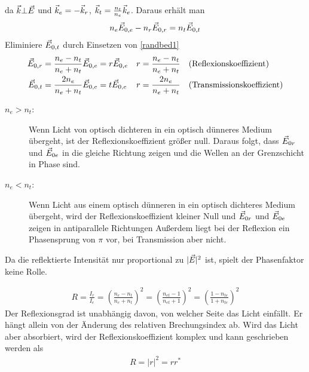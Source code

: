 da $\vec{k}\bot\vec{E}$ und $\vec{k}_e = -\vec{k}_r$, 
$\vec{k}_t = \frac{n_t}{n_e}\vec{k}_e$. Daraus erhält man
\begin{gather*}
  n_e\vec{E}_{0,e} -   n_r\vec{E}_{0,r} =   n_t\vec{E}_{0,t}
\end{gather*}
Eliminiere $\vec{E}_{0,t}$ durch Einsetzen von \eqref{randbed1}
\begin{align*}
  \vec{E}_{0,r} &= \frac{n_e-n_t}{n_e+n_t} \vec{E}_{0,e} = r\vec{E}_{0,e}
  &r &= \frac{n_e-n_t}{n_e+n_t} 
  &&\text{(Reflexionskoeffizient)}\\
  \vec{E}_{0,t} &= \frac{2n_e}{n_e+n_t} \vec{E}_{0,e} = t\vec{E}_{0,e}
  &r &= \frac{2n_e}{n_e+n_t} 
  &&\text{(Transmissionskoeffizient)}
\end{align*}%
%
%
%
%


\begin{description}
\item[$n_e>n_t$:] Wenn Licht von optisch dichteren in ein optisch dünneres
  Medium übergeht, ist der Reflexionskoeffizient größer null. 
  Daraus folgt, dass $\vec{E}_{0r}$ und $\vec{E}_{0e}$ in die gleiche
  Richtung zeigen und die Wellen an der Grenzschicht in Phase sind. 
\item[$n_e<n_t$:] Wenn Licht aus einem optisch dünneren in ein optisch dichteres
  Medium übergeht, wird der Reflexionskoeffizient kleiner Null und
  $\vec{E}_{0r}$ und $\vec{E}_{0e}$ zeigen in antiparallele Richtungen
  Außerdem liegt bei der Reflexion ein Phasensprung von $\pi$ vor,
  bei Transmission aber nicht.
\end{description}
Da die reflektierte Intensität nur proportional zu
$|\vec{E}|^2$ ist, spielt der Phasenfaktor keine Rolle.

\begin{gather*}
  R = \frac{I_r}{I_e}
  =\left( \frac{n_e-n_t}{n_e+n_t} \right)^2
  =\left( \frac{n_{et}-1}{n_{et}+1} \right)^2
  =\left( \frac{1-n_{te}}{1+n_{te}} \right)^2
\end{gather*}
Der Reflexionsgrad ist unabhängig davon, von welcher Seite das Licht
einfällt. Er hängt allein von der Änderung des relativen
Brechungsindex ab. Wird das Licht aber absorbiert, wird der
Reflexionskoeffizient komplex und kann geschrieben werden als
\begin{align*}
  R=\vert r\vert^2=rr^*
\end{align*}
